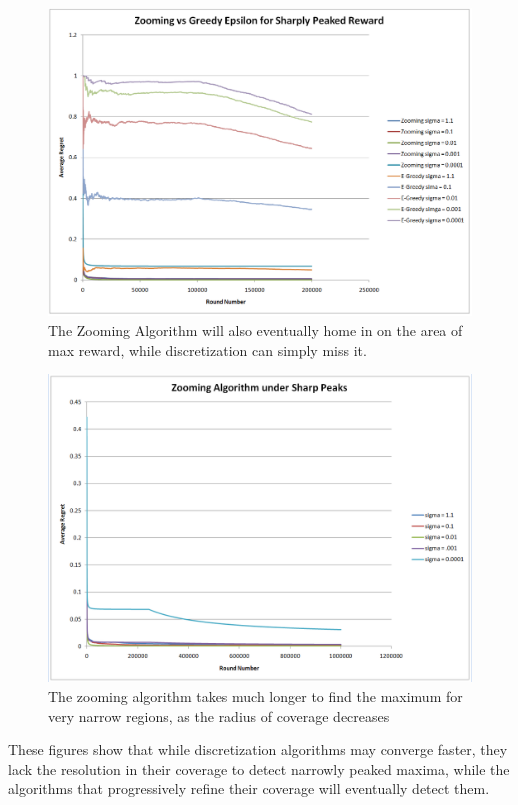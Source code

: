 \begin{figure}[!ht]
  \begin{center}
    \includegraphics[width=5 in]{figures/ZoomingEpsilonBump.png}
     \caption{The Zooming Algorithm will also eventually home in on
     the area of max reward, while discretization can simply miss it.}
     \label{fig:zoomebump}
  \end{center}
\end{figure}

\begin{figure}[!ht]
  \begin{center}
    \includegraphics[width=5 in]{figures/ZoomingBump.png}
     \caption{The zooming algorithm takes much longer to find the
     maximum for very narrow regions, as the radius of coverage
     decreases }
     \label{fig:zoombump2}
  \end{center}
\end{figure}

These figures show that while discretization algorithms may converge
faster, they lack the resolution in their coverage to detect narrowly
peaked maxima, while the algorithms that progressively refine their
coverage will eventually detect them.
